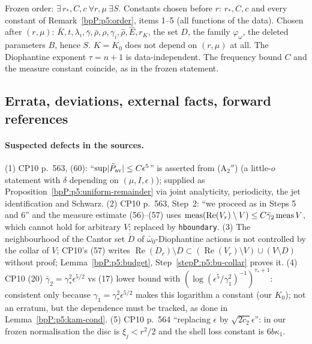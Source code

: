\begin{remark}\label{bpP:p5:quant}
Frozen order: $\exists\,r_*,C,c\ \forall r,\mu\ \exists S$. Constants chosen before $r$: $r_*,C,c$ and every constant of Remark~\ref{bpP:p5:order}, items 1--5 (all functions of the data). Chosen after $(r,\mu)$: $\bar K,t,\lambda_i,\bar\gamma,\bar\rho,\rho,\gamma_i,\hat\rho,\hat E,r_K$, the set $D$, the family $\varphi_\omega$, the deleted parameters $B$, hence $S$. $K=K_0$ does not depend on $(r,\mu)$ at all. The Diophantine exponent $\tau=n+1$ is data-independent. The frequency bound $C$ and the measure constant coincide, as in the frozen statement.
\end{remark}

\subsection{Errata, deviations, external facts, forward references}\label{bpP:p5:notes}

\paragraph{Suspected defects in the sources.} (1) CP10 p.~563, (60): ``$\sup\lvert \tilde P_{\rm av}\rvert\le C\epsilon^5$'' is asserted from (A$_2''$) (a little-$o$ statement with $\delta$ depending on $(\mu,I,\epsilon)$); supplied as Proposition~\ref{bpP:p5:uniform-remainder} via joint analyticity, periodicity, the jet identification and Schwarz. (2) CP10 p.~563, Step~2: ``we proceed as in Steps 5 and 6'' and the measure estimate (56)--(57) uses $\operatorname{meas}(\operatorname{Re}(V_r)\setminus V)\le C\bar\gamma_2\operatorname{meas} V$, which cannot hold for arbitrary $V$; replaced by \texttt{hboundary}. (3) The neighbourhood of the Cantor set $\check D$ of $\bar\omega_0$-Diophantine actions is not controlled by the collar of $V$; CP10's (57) writes $\operatorname{Re}(D_r)\setminus D\subset(\operatorname{Re}(V_r)\setminus V)\cup(V\setminus D)$ without proof; Lemma~\ref{bpP:p5:budget}, Step~\ref{stepP:p5:bu-collar} proves it. (4) CP10 (20) $\bar\gamma_2=\gamma_*^2\epsilon^{5/2}$ vs (17) lower bound with $(\log(\epsilon^5/\gamma_1^2)^{-1})^{\tau_*+1}$: consistent only because $\gamma_1=\gamma_*^2\epsilon^{5/2}$ makes this logarithm a constant (our $K_0$); not an erratum, but the dependence must be tracked, as done in Lemma~\ref{bpP:p5:kam-cond}. (5) CP10 p.~564 ``replacing $\epsilon$ by $\sqrt{2\check c_2}\epsilon$'': in our frozen normalisation the disc is $\xi_j<r^2/2$ and the shell loss constant is $6b\kappa_1$.
